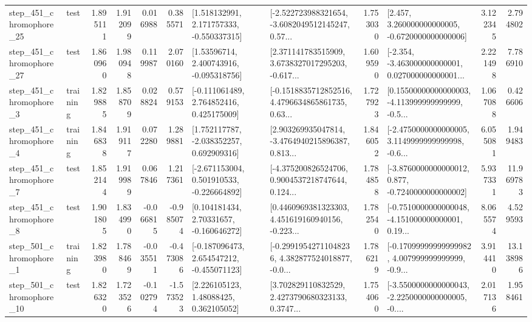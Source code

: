 \begin{tabular}{llrrrrllrlrr}
  step\_451\_chromophore\_25 &      test &      1.895111 &    1.912099 &      0.016988 &  0.385571 &    [1.518132991, 2.171757333, -0.550337315] &  [-2.522723988321654, -3.6082049512145247, 0.57... &       1.753030 &    [2.457, 3.260000000000005, -0.6720000000000006] &            3.122345 &          2.794802 \\
  step\_451\_chromophore\_27 &      test &      1.860960 &    1.980948 &      0.119987 &  2.070160 &     [1.53596714, 2.400743916, -0.095318756] &  [2.371141783515909, 3.6738327017295203, -0.617... &       1.609590 &  [-2.354, -3.463000000000001, 0.027000000000001... &            2.221498 &          7.786910 \\
   step\_451\_chromophore\_3 &  training &      1.829885 &    1.858709 &      0.028824 &  0.579153 &    [-0.111061489, 2.764852416, 0.425175009] &  [-0.1518835712852516, 4.4796634865861735, 0.63... &       1.727923 &  [0.15500000000000003, -4.113999999999999, -0.5... &            1.067088 &          0.426606 \\
   step\_451\_chromophore\_4 &  training &      1.846838 &    1.919117 &      0.072280 &  1.289881 &    [1.752117787, -2.038352257, 0.692909316] &  [2.903269935047814, -3.4764940215896387, 0.813... &       1.846052 &  [-2.4750000000000005, 3.1149999999999998, -0.6... &            6.055081 &          1.949483 \\
   step\_451\_chromophore\_7 &      test &      1.852144 &    1.919989 &      0.067846 &  1.217361 &   [-2.671153004, 0.501910533, -0.226664892] &  [-4.375200826524706, 0.9004537218747644, 0.124... &       1.784858 &  [-3.8760000000000012, 0.877, -0.7240000000000002] &            5.937331 &         11.969783 \\
   step\_451\_chromophore\_8 &      test &      1.901805 &    1.834990 &     -0.066815 & -0.985074 &     [0.104181434, 2.70331657, -0.160646272] &  [0.4460969381323303, 4.451619160940156, -0.223... &       1.782540 &  [-0.7510000000000048, -4.151000000000001, 0.19... &            8.065574 &          4.529593 \\
   step\_501\_chromophore\_1 &  training &      1.823980 &    1.788469 &     -0.035511 & -0.473086 &   [-0.187096473, 2.654547212, -0.455071123] &  [-0.29919542711048236, 4.382877524018877, -0.0... &       1.786219 &  [-0.17099999999999982, 4.007999999999999, -0.9... &            3.914410 &         13.138986 \\
  step\_501\_chromophore\_10 &      test &      1.826320 &    1.723526 &     -0.102794 & -1.573523 &      [2.226105123, 1.48088425, 0.362105052] &  [3.702829110832529, 2.4273790680323133, 0.3747... &       1.754060 &  [-3.5500000000000043, -2.2250000000000005, -0.... &            2.017136 &          1.958461 \\

\end{tabular}
